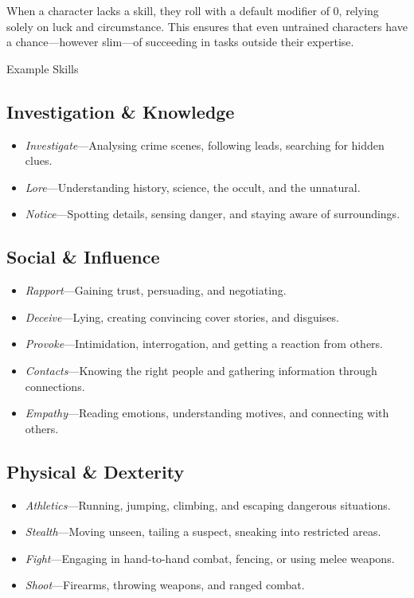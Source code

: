 When a character lacks a skill, they roll with a default modifier of 0, relying solely on luck and circumstance. This ensures that even untrained characters have a chance—however slim—of succeeding in tasks outside their expertise.



\BeginBoxPage


	\begin{multicols}{2}

		\begin{CommentBox}{Example Skills}
			\subsection*{Investigation \& Knowledge}  
			\begin{itemize}
				\item \emph{Investigate}---Analysing crime scenes, following leads, searching for hidden clues.
				\item \emph{Lore}---Understanding history, science, the occult, and the unnatural.
				\item \emph{Notice}---Spotting details, sensing danger, and staying aware of surroundings.
			\end{itemize}
	
			\subsection*{Social \& Influence}  
			\begin{itemize}
				\item \emph{Rapport}---Gaining trust, persuading, and negotiating.
				\item \emph{Deceive}---Lying, creating convincing cover stories, and disguises.
				\item \emph{Provoke}---Intimidation, interrogation, and getting a reaction from others.
				\item \emph{Contacts}---Knowing the right people and gathering information through connections.
				\item \emph{Empathy}---Reading emotions, understanding motives, and connecting with others.
			\end{itemize}
	
			\subsection*{Physical \& Dexterity}  
			\begin{itemize}
				\item \emph{Athletics}---Running, jumping, climbing, and escaping dangerous situations.
				\item \emph{Stealth}---Moving unseen, tailing a suspect, sneaking into restricted areas.
				\item \emph{Fight}---Engaging in hand-to-hand combat, fencing, or using melee weapons.
				\item \emph{Shoot}---Firearms, throwing weapons, and ranged combat.
			\end{itemize}
	

\end{CommentBox}
\end{multicols}
